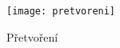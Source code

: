 
\begin{figure}[H]
	\centering
	\texttt{[image: pretvoreni]}
	\caption{Přetvoření}
	\label{fig:pretvoreni}
\end{figure}
